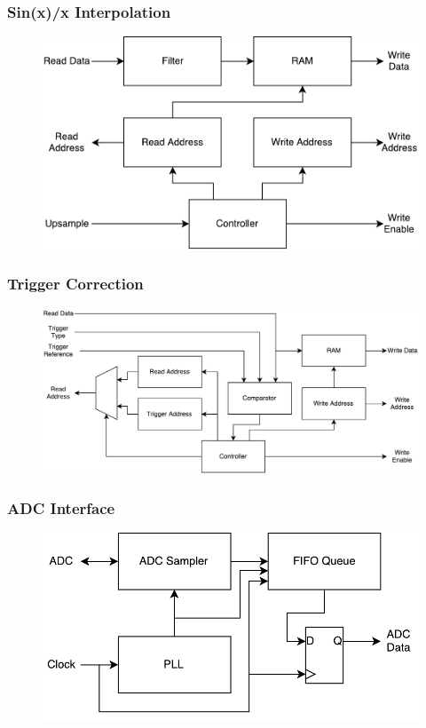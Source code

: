 \documentclass[pdf]{beamer}
\begin{document}
\begin{frame}
\frametitle{Sin(x)/x Interpolation}
\begin{figure}[!htb]
  \includegraphics[width=\linewidth]{diagrams/sinc_interpolation.pdf}
\end{figure}
\end{frame}

\begin{frame}
\frametitle{Trigger Correction}
\begin{figure}[!htb]
  \includegraphics[width=\linewidth]{diagrams/trigger_correction.pdf}
\end{figure}
\end{frame}

\begin{frame}
\frametitle{ADC Interface}
\begin{figure}[!htb]
  \includegraphics[width=\linewidth]{diagrams/adc_interface.pdf}
\end{figure}
\end{frame}
\end{document}
